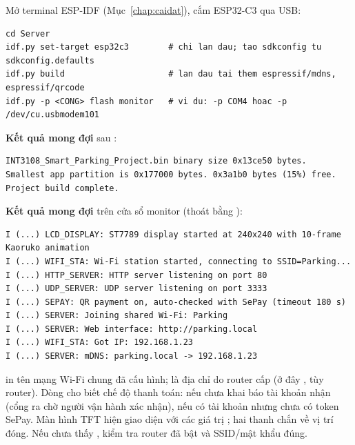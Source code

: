 Mở terminal ESP-IDF (Mục~\ref{chap:caidat}), cắm ESP32-C3 qua USB:
\begin{lstlisting}[style=shell]
cd Server
idf.py set-target esp32c3        # chi lan dau; tao sdkconfig tu sdkconfig.defaults
idf.py build                     # lan dau tai them espressif/mdns, espressif/qrcode
idf.py -p <CONG> flash monitor   # vi du: -p COM4 hoac -p /dev/cu.usbmodem101
\end{lstlisting}
\textbf{Kết quả mong đợi} sau :
\begin{lstlisting}[language={},numbers=none]
INT3108_Smart_Parking_Project.bin binary size 0x13ce50 bytes.
Smallest app partition is 0x177000 bytes. 0x3a1b0 bytes (15%) free.
Project build complete.
\end{lstlisting}
\textbf{Kết quả mong đợi} trên cửa sổ monitor (thoát bằng \code{Ctrl+]}):
\begin{lstlisting}[language={},numbers=none]
I (...) LCD_DISPLAY: ST7789 display started at 240x240 with 10-frame Kaoruko animation
I (...) WIFI_STA: Wi-Fi station started, connecting to SSID=Parking...
I (...) HTTP_SERVER: HTTP server listening on port 80
I (...) UDP_SERVER: UDP server listening on port 3333
I (...) SEPAY: QR payment on, auto-checked with SePay (timeout 180 s)
I (...) SERVER: Joining shared Wi-Fi: Parking
I (...) SERVER: Web interface: http://parking.local
I (...) WIFI_STA: Got IP: 192.168.1.23
I (...) SERVER: mDNS: parking.local -> 192.168.1.23
\end{lstlisting}
 in tên mạng Wi-Fi chung đã cấu hình;  là địa chỉ
do router cấp (ở đây , tùy router). Dòng  cho biết chế độ
thanh toán:  nếu chưa khai báo tài khoản nhận (cổng ra chờ người vận hành xác nhận),
 nếu có tài khoản nhưng chưa có token SePay. Màn hình TFT
hiện giao diện  với các giá trị ; hai thanh chắn về vị trí
đóng. Nếu chưa thấy , kiểm tra router đã bật và SSID/mật khẩu đúng.

